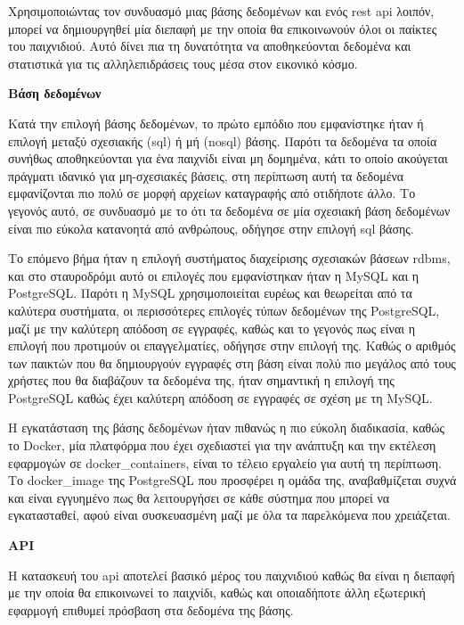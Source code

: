 Χρησιμοποιώντας τον συνδυασμό μιας βάσης δεδομένων και ενός \acrshort{rest} \acrshort{api} λοιπόν, μπορεί να δημιουργηθεί μία διεπαφή με την οποία θα επικοινωνούν όλοι οι παίκτες του παιχνιδιού. Αυτό δίνει πια τη δυνατότητα να αποθηκεύονται δεδομένα και στατιστικά για τις αλληλεπιδράσεις τους μέσα στον εικονικό κόσμο.

\textbf{Βάση δεδομένων}

Κατά την επιλογή βάσης δεδομένων, το πρώτο εμπόδιο που εμφανίστηκε ήταν ή επιλογή μεταξύ σχεσιακής (\acrshort{sql}\cite{noauthor_what_nodate-2}) ή μή (\acrshort{nosql}\cite{noauthor_what_nodate-3}) βάσης. Παρότι τα δεδομένα τα οποία συνήθως αποθηκεύονται για ένα παιχνίδι είναι μη δομημένα, κάτι το οποίο ακούγεται πράγματι ιδανικό για μη-σχεσιακές βάσεις, στη περίπτωση αυτή τα δεδομένα εμφανίζονται πιο πολύ σε μορφή αρχείων καταγραφής από οτιδήποτε άλλο. Το γεγονός αυτό, σε συνδυασμό με το ότι τα δεδομένα σε μία σχεσιακή βάση δεδομένων είναι πιο εύκολα κατανοητά από ανθρώπους, οδήγησε στην επιλογή \acrshort{sql} βάσης.

Το επόμενο βήμα ήταν η επιλογή συστήματος διαχείρισης σχεσιακών βάσεων \acrfull{rdbms}, και στο σταυροδρόμι αυτό οι επιλογές που εμφανίστηκαν ήταν η MySQL\cite{noauthor_mysql_nodate} και η PostgreSQL\cite{group_postgresql_2024}. Παρότι η MySQL χρησιμοποιείται ευρέως και θεωρείται από τα καλύτερα συστήματα, οι περισσότερες επιλογές τύπων δεδομένων της PostgreSQL, μαζί με την καλύτερη απόδοση σε εγγραφές, καθώς και το γεγονός πως είναι η επιλογή που προτιμούν οι επαγγελματίες\cite{noauthor_stack_nodate}, οδήγησε στην επιλογή της. Καθώς ο αριθμός των παικτών που θα δημιουργούν εγγραφές στη βάση είναι πολύ πιο μεγάλος από τους χρήστες που θα διαβάζουν τα δεδομένα της, ήταν σημαντική η επιλογή της PostgreSQL καθώς έχει καλύτερη απόδοση σε εγγραφές σε σχέση με τη MySQL.

Η εγκατάσταση της βάσης δεδομένων ήταν πιθανώς η πιο εύκολη διαδικασία, καθώς το Docker\cite{noauthor_docker_nodate}, μία πλατφόρμα που έχει σχεδιαστεί για την ανάπτυξη και την εκτέλεση εφαρμογών σε \glspl{docker_container}, είναι το τέλειο εργαλείο για αυτή τη περίπτωση. Το \gls{docker_image} της PostgreSQL που προσφέρει η ομάδα της, αναβαθμίζεται συχνά και είναι εγγυημένο πως θα λειτουργήσει σε κάθε σύστημα που μπορεί να εγκατασταθεί, αφού είναι συσκευασμένη μαζί με όλα τα παρελκόμενα που χρειάζεται.

\textbf{API}

Η κατασκευή του \acrshort{api} αποτελεί βασικό μέρος του παιχνιδιού καθώς θα είναι η διεπαφή με την οποία θα επικοινωνεί το παιχνίδι, καθώς και οποιαδήποτε άλλη εξωτερική εφαρμογή επιθυμεί πρόσβαση στα δεδομένα της βάσης.

